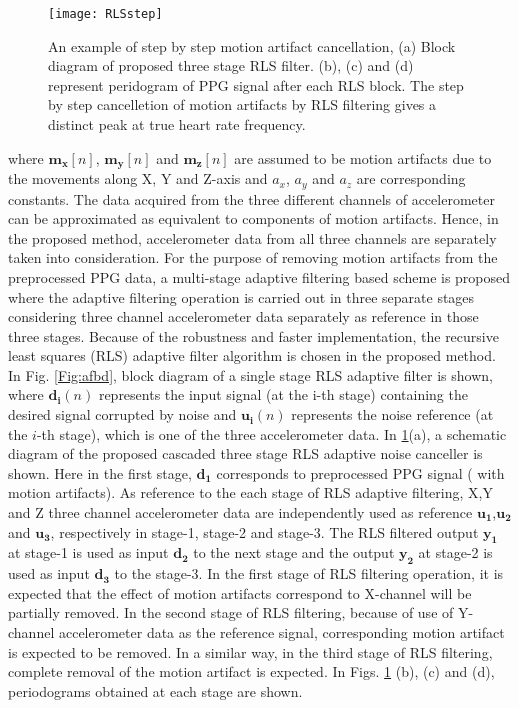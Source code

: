 \documentclass[final,3p,times,authoryear]{elsarticle}
\begin{document}
\begin{figure}[h]
	\centering
	\texttt{[image: RLSstep]}\\
  \caption{An example of step by step motion artifact cancellation, (a) Block diagram of proposed three stage RLS filter. (b), (c) and (d) represent peridogram of PPG signal after each RLS block. The step by step cancelletion of  motion artifacts by RLS filtering gives a distinct peak at true heart rate frequency.}\label{Fig:stepbystep}
\end{figure}

where $\boldsymbol{m_x}[n]$, $\boldsymbol{m_y}[n]$ and $\boldsymbol{m_z}[n]$ are assumed to be motion artifacts due to the movements along X, Y and Z-axis and $a_x$, $a_y$ and $a_z$ are corresponding constants. The data acquired from the three different channels of accelerometer can be approximated as equivalent to components of motion artifacts. Hence, in the proposed method, accelerometer data from all three channels are separately taken into consideration. For the purpose of removing motion artifacts from the preprocessed PPG data, a multi-stage adaptive filtering based scheme is proposed where the adaptive filtering operation is carried out in three separate stages considering three channel accelerometer data separately as reference in those three stages. Because of the robustness and faster implementation, the recursive least squares (RLS) adaptive filter algorithm is chosen in the proposed method. In Fig. \ref{Fig:afbd}, block diagram of a single stage RLS adaptive filter is shown, where $\boldsymbol{d_i}(n)$ represents the input signal (at the i-th stage) containing the desired signal corrupted by noise and $\boldsymbol{u_i}(n)$ represents the noise reference (at the $i$-th stage), which is one of the three accelerometer data. In \ref{Fig:stepbystep}(a), a schematic diagram of the proposed cascaded three stage RLS adaptive noise canceller is shown. Here in the first stage, $\boldsymbol{d_1}$ corresponds to preprocessed PPG signal ( with motion artifacts). As reference to the each stage of RLS adaptive filtering, X,Y and Z three channel accelerometer data are independently used as reference $\boldsymbol{u_1}$,$\boldsymbol{u_2}$ and $\boldsymbol{u_3}$, respectively in stage-1, stage-2 and stage-3. The RLS filtered output $\boldsymbol{y_1}$ at stage-1 is  used as input $\boldsymbol{d_2}$ to the next stage and the output $\boldsymbol{y_2}$ at stage-2 is used as input $\boldsymbol{d_3}$ to the stage-3. In the first stage of RLS filtering operation, it is expected that the effect of motion artifacts correspond to X-channel will be partially removed. In the second stage of RLS filtering, because of use of Y-channel accelerometer data as the reference signal, corresponding motion artifact is expected to be removed. In a similar way, in the third stage of RLS filtering, complete removal of the motion artifact is expected. In Figs. \ref{Fig:stepbystep} (b), (c) and (d), periodograms obtained at each stage are shown.  
\end{document}
